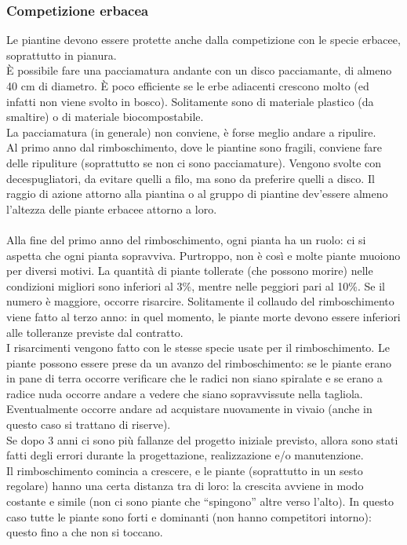 \subsubsection{Competizione erbacea}
Le piantine devono essere protette anche dalla competizione con le specie erbacee, soprattutto in pianura.\\
È possibile fare una pacciamatura andante con un disco pacciamante, di almeno 40 cm di diametro. È poco efficiente se le erbe adiacenti crescono molto (ed infatti non viene svolto in bosco). Solitamente sono di materiale plastico (da smaltire) o di materiale biocompostabile.\\
La pacciamatura (in generale) non conviene, è forse meglio andare a ripulire.\\
Al primo anno dal rimboschimento, dove le piantine sono fragili, conviene fare delle ripuliture (soprattutto se non ci sono pacciamature). Vengono svolte con decespugliatori, da evitare quelli a filo, ma sono da preferire quelli a disco. Il raggio di azione attorno alla piantina o al gruppo di piantine dev'essere almeno l'altezza delle piante erbacee attorno a loro.\\\\
Alla fine del primo anno del rimboschimento, ogni pianta ha un ruolo: ci si aspetta che ogni pianta sopravviva. Purtroppo, non è così e molte piante muoiono per diversi motivi. La quantità di piante tollerate (che possono morire) nelle condizioni migliori sono inferiori al 3\%, mentre nelle peggiori pari al 10\%. Se il numero è maggiore, occorre risarcire. Solitamente il collaudo del rimboschimento viene fatto al terzo anno: in quel momento, le piante morte devono essere inferiori alle tolleranze previste dal contratto.\\
I risarcimenti vengono fatto con le stesse specie usate per il rimboschimento. Le piante possono essere prese da un avanzo del rimboschimento: se le piante erano in pane di terra occorre verificare che le radici non siano spiralate e se erano a radice nuda occorre andare a vedere che siano sopravvissute nella tagliola. Eventualmente occorre andare ad acquistare nuovamente in vivaio (anche in questo caso si trattano di riserve).\\
Se dopo 3 anni ci sono più fallanze del progetto iniziale previsto, allora sono stati fatti degli errori durante la progettazione, realizzazione e/o manutenzione.\\
Il rimboschimento comincia a crescere, e le piante (soprattutto in un sesto regolare) hanno una certa distanza tra di loro: la crescita avviene in modo costante e simile (non ci sono piante che ``spingono'' altre verso l'alto). In questo caso tutte le piante sono forti e dominanti (non hanno competitori intorno): questo fino a che non si toccano.\\
